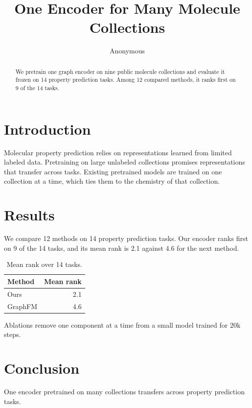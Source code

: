 \documentclass[11pt]{article}
\title{One Encoder for Many Molecule Collections}
\author{Anonymous}
\date{}
\begin{document}
\maketitle
\begin{abstract}
We pretrain one graph encoder on nine public molecule collections and evaluate it frozen on 14 property
prediction tasks. Among 12 compared methods, it ranks first on 9 of the 14 tasks.
\end{abstract}
\section{Introduction}
Molecular property prediction relies on representations learned from limited labeled data. Pretraining on large
unlabeled collections promises representations that transfer across tasks. Existing pretrained models are trained
on one collection at a time, which ties them to the chemistry of that collection.
\section{Results}
We compare 12 methods on 14 property prediction tasks. Our encoder ranks first on 9 of the 14 tasks, and its mean
rank is 2.1 against 4.6 for the next method.
\begin{table}[h]
\centering
\caption{Mean rank over 14 tasks.}\label{tab:bench}
\begin{tabular}{lr}
\toprule
Method & Mean rank \\
\midrule
Ours & 2.1 \\
GraphFM & 4.6 \\
\bottomrule
\end{tabular}
\end{table}
Ablations remove one component at a time from a small model trained for 20k steps.
\section{Conclusion}
One encoder pretrained on many collections transfers across property prediction tasks.
\end{document}

